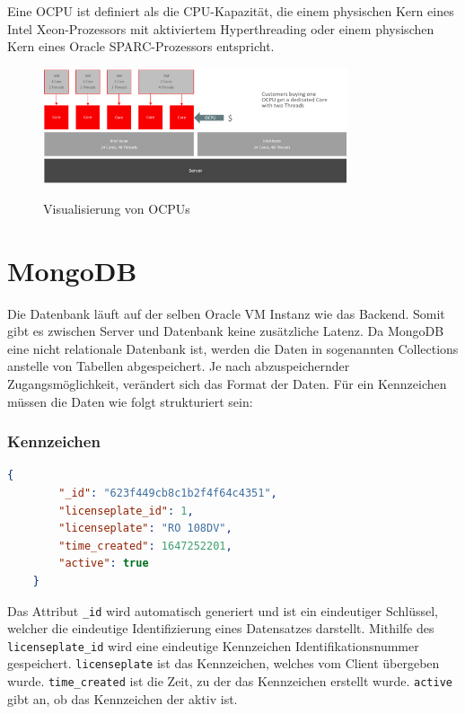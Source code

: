     Eine OCPU ist definiert als die CPU-Kapazität, die einem physischen Kern eines Intel Xeon-Prozessors mit aktiviertem Hyperthreading oder einem physischen Kern eines Oracle SPARC-Prozessors entspricht.
    \begin{figure}[H]
        \centering
        \includegraphics[width=0.8\textwidth]{pics/OCPU.jpg}
        \caption{Visualisierung von OCPUs}
        \cite{ocpuPic}
        \label{fig:vm:OCPU}
    \end{figure}
\cite{vcpuVsocpu}
\section{MongoDB}
Die Datenbank läuft auf der selben Oracle VM Instanz wie das Backend. Somit gibt es zwischen Server und Datenbank keine zusätzliche Latenz. Da MongoDB eine nicht relationale Datenbank ist, werden die Daten in sogenannten Collections anstelle von Tabellen abgespeichert. Je nach abzuspeichernder Zugangsmöglichkeit, verändert sich das Format der Daten.
Für ein Kennzeichen müssen die Daten wie folgt strukturiert sein:

\subsubsection{Kennzeichen}
\begin{lstlisting}[language=JSON, caption=Aufbau eines Kennzeichen in der Datenbank, label=lst:lsg:licenseplate]
    {
        "_id": "623f449cb8c1b2f4f64c4351",
        "licenseplate_id": 1,
        "licenseplate": "RO 108DV",
        "time_created": 1647252201,
        "active": true
    }
\end{lstlisting}
Das Attribut \verb|_id| wird automatisch generiert und ist ein eindeutiger Schlüssel, welcher die eindeutige Identifizierung eines Datensatzes darstellt. Mithilfe des \verb|licenseplate_id| wird eine eindeutige Kennzeichen Identifikationsnummer gespeichert. \verb|licenseplate| ist das Kennzeichen, welches vom Client übergeben wurde. \verb|time_created| ist die Zeit, zu der das Kennzeichen erstellt wurde. \verb|active| gibt an, ob das Kennzeichen der aktiv ist.

